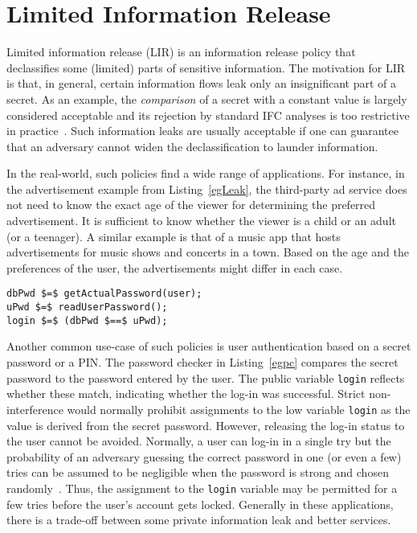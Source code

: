 \section{Limited Information Release}
\label{sec:lir-desc}
Limited information release (LIR) is an information release policy
that declassifies some (limited) parts of sensitive information. 
The motivation for LIR is that, in
general, certain information flows leak only an insignificant part of
a secret. As an example, the \emph{comparison} of a secret with a
constant value is largely considered acceptable and its rejection by
standard IFC analyses is too restrictive in
practice~\cite{scd,dta}. Such information leaks are usually
acceptable if one can guarantee that an adversary cannot widen the
declassification to launder information. 

In the real-world, such policies find a wide range of applications. For instance, 
in the advertisement example from Listing~\ref{egLeak}, the third-party 
ad service does not need to know the exact age of the viewer for determining 
the preferred advertisement. It is sufficient to know whether the viewer is 
a child or an adult (or a teenager). A similar example is that of a music 
app that hosts advertisements for music shows and concerts in a town. Based
on the age and the preferences of the user, the advertisements might differ 
in each case. 

\begin{lstlisting}[float,caption=Password Checker, label=egpc]
dbPwd $=$ getActualPassword(user);
uPwd $=$ readUserPassword();
login $=$ (dbPwd $==$ uPwd);
\end{lstlisting}

Another common use-case of such policies is user authentication 
based on a secret password or a PIN. The password checker in 
Listing~\ref{egpc} compares the secret password to 
the password entered by the user. The public variable \texttt{login}
reflects whether these match, indicating whether the log-in was
successful. Strict non-interference would normally prohibit 
assignments to the low variable \texttt{login} as the value is 
derived from the secret password. However, releasing the log-in 
status to the user cannot be avoided. Normally, a user can log-in 
in a single try but the probability of an adversary guessing the
correct password in one (or even a few) tries can be
assumed to be negligible when the password is strong and chosen 
randomly~\cite{relSec}. 
Thus, the assignment to the \texttt{login} variable may be permitted 
for a few tries before the user's account gets locked.
Generally in these applications, there is a trade-off between some 
private information leak and better services.

